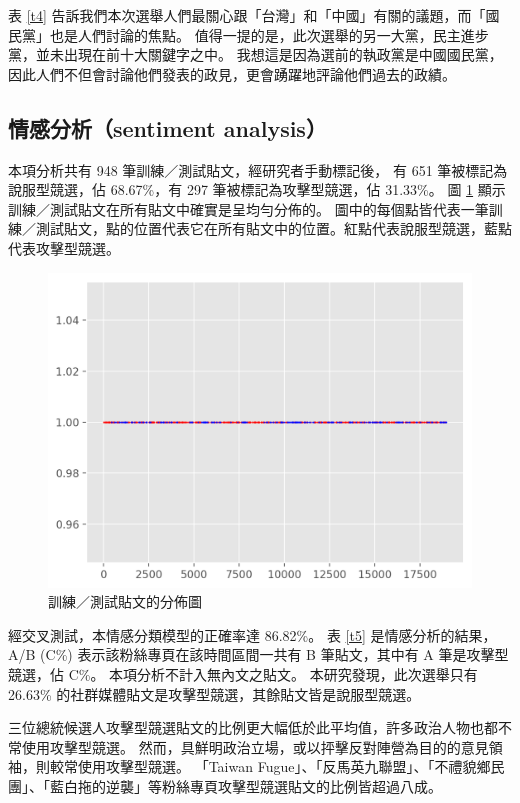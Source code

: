 \documentclass[a4paper, 10pt, conference]{ieeeconf}       %
\begin{document}
\begin{CJK}{UTF8}{bsmi}
表 \ref{t4} 告訴我們本次選舉人們最關心跟「台灣」和「中國」有關的議題，而「國民黨」也是人們討論的焦點。%
值得一提的是，此次選舉的另一大黨，民主進步黨，並未出現在前十大關鍵字之中。%
我想這是因為選前的執政黨是中國國民黨，因此人們不但會討論他們發表的政見，更會踴躍地評論他們過去的政績。%

\subsection*{情感分析（sentiment analysis）}

本項分析共有 948 筆訓練／測試貼文，經研究者手動標記後，%
有 651 筆被標記為說服型競選，佔 68.67\%，有 297 筆被標記為攻擊型競選，佔 31.33\%。%
圖 \ref{f3} 顯示訓練／測試貼文在所有貼文中確實是呈均勻分佈的。%
圖中的每個點皆代表一筆訓練／測試貼文，點的位置代表它在所有貼文中的位置。紅點代表說服型競選，藍點代表攻擊型競選。%

\begin{figure}[!htbp]
\centering
\includegraphics[width=\columnwidth]{meta}
\caption{訓練／測試貼文的分佈圖}
\label{f3}
\end{figure}

經交叉測試，本情感分類模型的正確率達 86.82\%。%
表 \ref{t5} 是情感分析的結果，A/B (C\%) 表示該粉絲專頁在該時間區間一共有 B 筆貼文，其中有 A 筆是攻擊型競選，佔 C\%。%
本項分析不計入無內文之貼文。%
本研究發現，此次選舉只有 26.63\% 的社群媒體貼文是攻擊型競選，其餘貼文皆是說服型競選。%

三位總統候選人攻擊型競選貼文的比例更大幅低於此平均值，許多政治人物也都不常使用攻擊型競選。%
然而，具鮮明政治立場，或以抨擊反對陣營為目的的意見領袖，則較常使用攻擊型競選。%
「Taiwan Fugue」、「反馬英九聯盟」、「不禮貌鄉民團」、「藍白拖的逆襲」等粉絲專頁攻擊型競選貼文的比例皆超過八成。%


\end{CJK}
\end{document}
